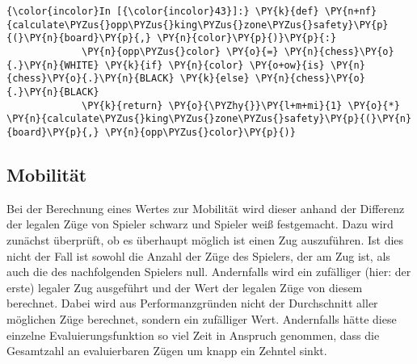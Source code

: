     \begin{Verbatim}[commandchars=\\\{\}]
{\color{incolor}In [{\color{incolor}43}]:} \PY{k}{def} \PY{n+nf}{calculate\PYZus{}opp\PYZus{}king\PYZus{}zone\PYZus{}safety}\PY{p}{(}\PY{n}{board}\PY{p}{,} \PY{n}{color}\PY{p}{)}\PY{p}{:}
             \PY{n}{opp\PYZus{}color} \PY{o}{=} \PY{n}{chess}\PY{o}{.}\PY{n}{WHITE} \PY{k}{if} \PY{n}{color} \PY{o+ow}{is} \PY{n}{chess}\PY{o}{.}\PY{n}{BLACK} \PY{k}{else} \PY{n}{chess}\PY{o}{.}\PY{n}{BLACK}
             \PY{k}{return} \PY{o}{\PYZhy{}}\PY{l+m+mi}{1} \PY{o}{*} \PY{n}{calculate\PYZus{}king\PYZus{}zone\PYZus{}safety}\PY{p}{(}\PY{n}{board}\PY{p}{,} \PY{n}{opp\PYZus{}color}\PY{p}{)}
\end{Verbatim}

    \subsection{Mobilität}\label{mobilituxe4t}

Bei der Berechnung eines Wertes zur Mobilität wird dieser anhand der
Differenz der legalen Züge von Spieler schwarz und Spieler weiß
festgemacht. Dazu wird zunächst überprüft, ob es überhaupt möglich ist
einen Zug auszuführen. Ist dies nicht der Fall ist sowohl die Anzahl der
Züge des Spielers, der am Zug ist, als auch die des nachfolgenden
Spielers null. Andernfalls wird ein zufälliger (hier: der erste) legaler
Zug ausgeführt und der Wert der legalen Züge von diesem berechnet. Dabei
wird aus Performanzgründen nicht der Durchschnitt aller möglichen Züge
berechnet, sondern ein zufälliger Wert. Andernfalls hätte diese einzelne
Evaluierungsfunktion so viel Zeit in Anspruch genommen, dass die
Gesamtzahl an evaluierbaren Zügen um knapp ein Zehntel sinkt.


